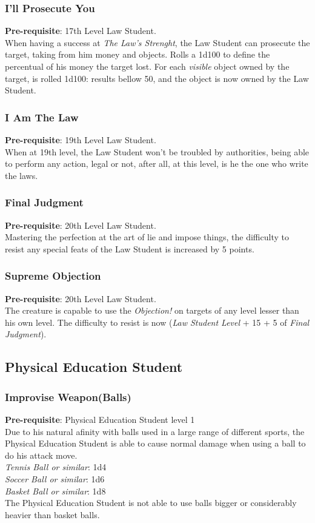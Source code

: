 \documentclass[ letterpaper,12pt]{article}
\begin{document}
\subsubsection{I'll Prosecute You}
{\bf Pre-requisite}: 17th Level Law Student.\\
When having a success at {\it The Law's Strenght}, the Law Student can prosecute the target, taking from him money and objects. Rolls a 1d100 to define the percentual of his money the target lost. For each {\it visible} object owned by the target, is rolled 1d100: results bellow 50, and the object is now owned by the Law Student.

\subsubsection{I Am The Law}
{\bf Pre-requisite}: 19th Level Law Student.\\
When at 19th level, the Law Student won't be troubled by authorities, being able to perform any action, legal or not, after all, at this level, is he the one who write the laws.

\subsubsection{Final Judgment}
{\bf Pre-requisite}: 20th Level Law Student.\\
Mastering the perfection at the art of lie and impose things, the difficulty to resist any special feats of the Law Student is increased by 5 points.

\subsubsection{Supreme Objection}
{\bf Pre-requisite}: 20th Level Law Student.\\
The creature is capable to use the {\it Objection!} on targets of any level lesser than his own level.  The difficulty to resist is now ({\it Law Student Level} + 15 + 5 of {\it Final Judgment}).

\subsection{Physical Education Student}

\subsubsection{Improvise Weapon(Balls)}
{\bf Pre-requisite}: Physical Education Student level 1\\
 Due to his natural afinity with balls used in a large range of different sports, the Physical Education Student is able to cause normal damage when using a ball to do his attack move.\\
{\it Tennis Ball or similar}: 1d4\\
{\it Soccer Ball or similar}: 1d6\\
{\it Basket Ball or similar}: 1d8\\
The Physical Education Student is not able to use balls bigger or considerably heavier than basket balls.
\end{document}
